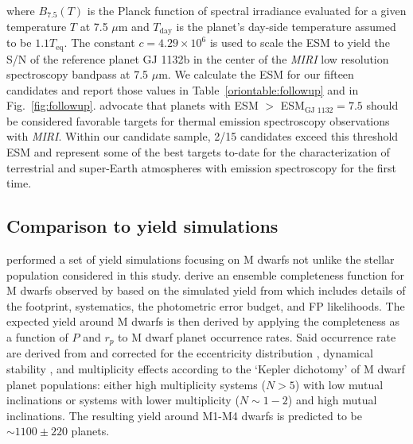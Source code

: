 \noindent where $B_{7.5}(T)$ is the Planck function of spectral irradiance evaluated for a given temperature
$T$ at 7.5 $\mu$m and $T_{\text{day}}$ is the planet's day-side temperature assumed to be $1.1T_{\text{eq}}$.
The constant $c=4.29\times 10^6$ is used to scale the ESM to yield the S/N of the reference planet GJ 1132b
\citep{berta15,dittmann17b} in the center of the \emph{MIRI} low resolution spectroscopy bandpass at 7.5 $\mu$m. 
We calculate the ESM for our fifteen candidates and report those values in Table~\ref{oriontable:followup} and in
Fig.~\ref{fig:followup}. \cite{kempton18} advocate that planets with ESM $>$ ESM$_{\text{GJ 1132}}=7.5$ should
be considered favorable targets for thermal emission spectroscopy observations with \emph{MIRI}. Within our
candidate sample, 2/15 candidates exceed this threshold ESM and represent some of the best targets to-date for
the characterization of terrestrial and super-Earth atmospheres with emission spectroscopy for the first time.


\subsection{Comparison to yield simulations}
\cite{ballard18} performed a set of yield simulations focusing on M dwarfs not unlike the
stellar population considered in this study. \cite{ballard18} derive an ensemble completeness
function for M dwarfs observed by \tess{} based on the simulated \tess{} yield
from \cite{sullivan15} which includes details of the \tess{} footprint, systematics, the
photometric error budget, and FP likelihoods. The expected \tess{} yield around M dwarfs is
then derived by applying the completeness as a function of $P$ and $r_p$ to M dwarf planet
occurrence rates. Said occurrence rate are
derived from \cite{dressing15a} and corrected for the eccentricity
distribution \citep{limbach15}, dynamical stability \citep{fabrycky12}, and multiplicity
effects according to the `Kepler dichotomy' \citep{ballard16} of M dwarf planet populations:
either high multiplicity systems ($N>5$) with low mutual inclinations or systems with lower
multiplicity ($N\sim 1-2$) and high mutual inclinations. The resulting \tess{} yield
around M1-M4 dwarfs is predicted to be $\sim 1100 \pm 220$ planets. \\

